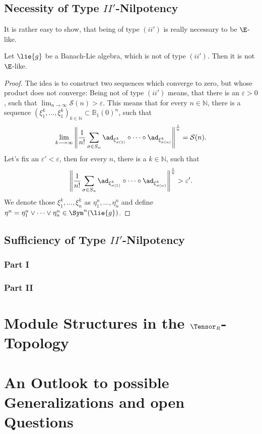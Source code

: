 \documentclass[
11pt,                          %
english                        %
]{article}
\begin{document}
\subsection{Necessity of Type $II'$-Nilpotency}
It is rather easy to show, that being of type $(ii')$ is really necessary to be 
$\E$-like.
\begin{proposition}
	Let $\lie{g}$ be a Banach-Lie algebra, which is not of type $(ii')$. Then it is 
	not $\E$-like.
\end{proposition}
\begin{proof}
	The idea is to construct two sequences which converge to zero, but whose 
	product does not converge: Being not of type $(ii')$ means, that there is an
	$\varepsilon > 0$, such that $\lim_{n \rightarrow \infty} \mathcal{S}(n) > 
	\varepsilon$. This means that for every $n \in \mathbb{N}$, there is a sequence 
	$\left(\xi_1^k, \ldots, \xi_1^k\right)_{k \in \mathbb{N}} \subset 
	\mathbb{B}_1(0)^n$, 
	such that
	\begin{equation*}
		\lim_{k \longrightarrow \infty}
		\left\Vert
			\frac{1}{n!}
			\sum\limits_{\sigma \in S_n}
			\ad_{\xi_{\sigma(1)}^k}
			\circ \cdots \circ
			\ad_{\xi_{\sigma(n)}^k}
		\right\Vert^{\frac{1}{n}}
		=
		\mathcal{S}(n).
	\end{equation*}
	Let's fix an $\varepsilon' < \varepsilon$, then for every $n$, there is a $k 
	\in \mathbb{N}$, such that
	\begin{equation*}
		\left\Vert
			\frac{1}{n!}
			\sum\limits_{\sigma \in S_n}
			\ad_{\xi_{\sigma(1)}^k}
			\circ \cdots \circ
			\ad_{\xi_{\sigma(n)}^k}
		\right\Vert^{\frac{1}{n}}
		> \varepsilon'.
	\end{equation*}
	We denote those $\xi_1^k, \ldots, \xi_n^k$ as $\eta_1^n, \ldots, \eta_n^n$ and 
	define $\eta^n = \eta_1^n \vee \cdots \vee \eta_n^n \in \Sym^n(\lie{g})$.
\end{proof}


\subsection{Sufficiency of Type $II'$-Nilpotency}

\subsubsection{Part I}

\subsubsection{Part II}


\section{Module Structures in the $\Tensor_R$-Topology}


\section{An Outlook to possible Generalizations and open Questions}
\end{document}
